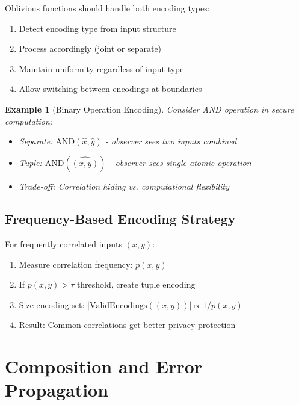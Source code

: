 \documentclass[11pt,final,hidelinks]{article}
\newtheorem{example}[theorem]{Example}
\begin{document}
\begin{construction}
Oblivious functions should handle both encoding types:
\begin{enumerate}
    \item Detect encoding type from input structure
    \item Process accordingly (joint or separate)
    \item Maintain uniformity regardless of input type
    \item Allow switching between encodings at boundaries
\end{enumerate}
\end{construction}

\begin{example}[Binary Operation Encoding]
Consider AND operation in secure computation:
\begin{itemize}
    \item Separate: $\text{AND}(\hat{x}, \hat{y})$ - observer sees two inputs combined
    \item Tuple: $\text{AND}(\widehat{(x,y)})$ - observer sees single atomic operation
    \item Trade-off: Correlation hiding vs. computational flexibility
\end{itemize}
\end{example}

\subsection{Frequency-Based Encoding Strategy}

\begin{construction}
For frequently correlated inputs $(x,y)$:
\begin{enumerate}
    \item Measure correlation frequency: $p(x,y)$
    \item If $p(x,y) > \tau$ threshold, create tuple encoding
    \item Size encoding set: $|\text{ValidEncodings}((x,y))| \propto 1/p(x,y)$
    \item Result: Common correlations get better privacy protection
\end{enumerate}
\end{construction}

\section{Composition and Error Propagation}
\end{document}
